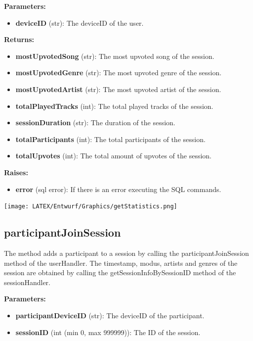 \documentclass[oneside, ngerman]{sdqtechreport}
\begin{document}
\textbf{Parameters:}

\begin{itemize}
    \item \textbf{deviceID} (str): The deviceID of the user.
\end{itemize}

\textbf{Returns:}

\begin{itemize}
    \item \textbf{mostUpvotedSong} (str): The most upvoted song of the session.
    \item \textbf{mostUpvotedGenre} (str): The most upvoted genre of the session.
    \item \textbf{mostUpvotedArtist} (str): The most upvoted artist of the session.
    \item \textbf{totalPlayedTracks} (int): The total played tracks of the session.
    \item \textbf{sessionDuration} (str): The duration of the session.
    \item \textbf{totalParticipants} (int): The total participants of the session.
    \item \textbf{totalUpvotes} (int): The total amount of upvotes of the session.
\end{itemize}

\textbf{Raises:}

\begin{itemize}
    \item \textbf{error} (sql error): If there is an error executing the SQL commands.
\end{itemize}

\begin{center}
   \texttt{[image: LATEX/Entwurf/Graphics/getStatistics.png]} 
\end{center}



\subsection*{participantJoinSession}

The method adds a participant to a session by calling the participantJoinSession method of the userHandler. The timestamp, modus, artists and genres of the session are obtained by calling the getSessionInfoBySessionID method of the sessionHandler.

\textbf{Parameters:}

\begin{itemize}
    \item \textbf{participantDeviceID} (str): The deviceID of the participant.
    \item \textbf{sessionID} (int (min 0, max 999999)): The ID of the session.
\end{itemize}
\end{document}
